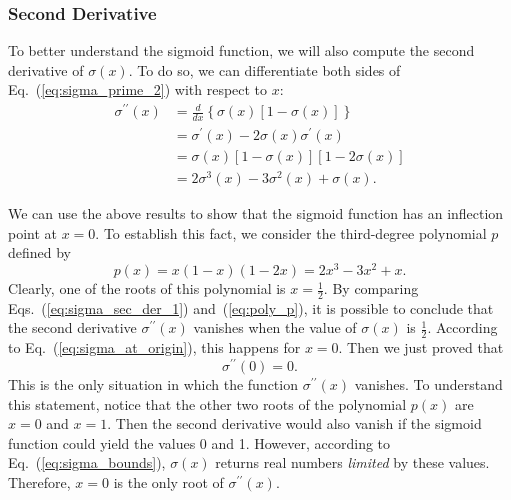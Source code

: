 \documentclass[10pt,american]{scrartcl}
\begin{document}
\subsubsection*{Second Derivative}

To better understand the sigmoid function, we will also compute the second
derivative of $\sigma\left(x\right)$. To do so, we can differentiate both sides
of Eq.~(\ref{eq:sigma_prime_2}) with respect to $x$:
\begin{align}
\nonumber\sigma^{\prime\prime}\left(x\right)&=\frac{d}{dx}\left\{\sigma\left(x\right)\left[1-\sigma\left(x\right)\right]\right\}\\
\nonumber&=\sigma^{\prime}\left(x\right)-2\sigma\left(x\right)\sigma^{\prime}\left(x\right)\\
\nonumber&=\sigma\left(x\right)\left[1-\sigma\left(x\right)\right]\left[1-2\sigma\left(x\right)\right]\\
&=2\sigma^{3}\left(x\right)-3\sigma^{2}\left(x\right)+\sigma\left(x\right).
\label{eq:sigma_sec_der_1}
\end{align}

We can use the above results to show that the sigmoid function has an
inflection point at $x=0$. To establish this fact, we consider the third-degree
polynomial $p$ defined by
\begin{equation}
p\left(x\right)=x\left(1-x\right)\left(1-2x\right)=2x^{3}-3x^{2}+x.
\label{eq:poly_p}
\end{equation}
Clearly, one of the roots of this polynomial is $x=\frac{1}{2}$. By comparing
Eqs.~(\ref{eq:sigma_sec_der_1}) and~(\ref{eq:poly_p}), it is possible to
conclude that the second derivative $\sigma^{\prime\prime}\left(x\right)$
vanishes when the value of $\sigma\left(x\right)$ is $\frac{1}{2}$. According
to Eq.~(\ref{eq:sigma_at_origin}), this happens for $x=0$. Then we just proved
that
\begin{equation}
\sigma^{\prime\prime}\left(0\right)=0.
\label{eq:sec_der_at_origin}
\end{equation}
This is the only situation in which the function
$\sigma^{\prime\prime}\left(x\right)$ vanishes. To understand this statement,
notice that the other two roots of the polynomial $p\left(x\right)$ are $x=0$
and $x=1$. Then the second derivative would also vanish if the sigmoid function
could yield the values 0 and 1. However, according to
Eq.~(\ref{eq:sigma_bounds}), $\sigma\left(x\right)$ returns real numbers
\textit{limited} by these values. Therefore, $x=0$ is the only root of
$\sigma^{\prime\prime}\left(x\right)$.
\end{document}
